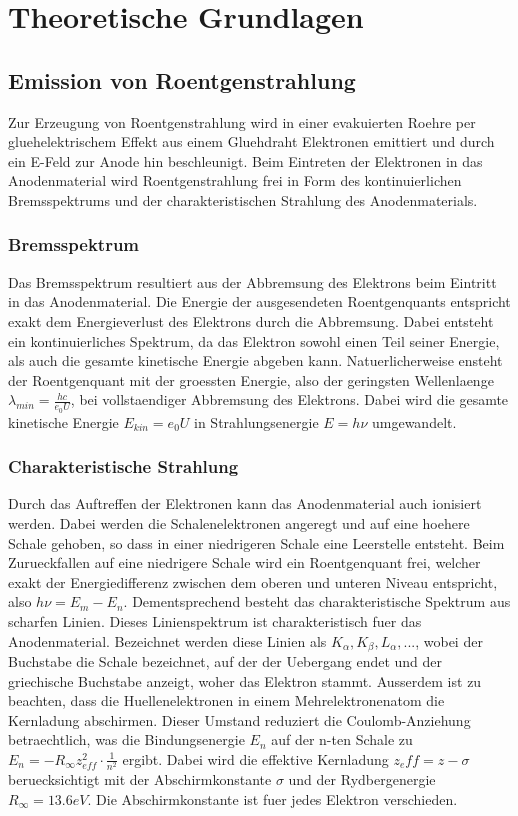\section{Theoretische Grundlagen}
\subsection{Emission von Roentgenstrahlung}
Zur Erzeugung von Roentgenstrahlung wird in einer evakuierten Roehre per gluehelektrischem Effekt aus einem Gluehdraht Elektronen emittiert und durch ein E-Feld zur Anode hin beschleunigt. Beim Eintreten der Elektronen in das Anodenmaterial wird Roentgenstrahlung frei in Form des kontinuierlichen Bremsspektrums und der charakteristischen Strahlung des Anodenmaterials.
\subsubsection{Bremsspektrum}
Das Bremsspektrum resultiert aus der Abbremsung des Elektrons beim Eintritt in das Anodenmaterial. Die Energie der ausgesendeten Roentgenquants entspricht exakt dem Energieverlust des Elektrons durch die Abbremsung. Dabei entsteht ein kontinuierliches Spektrum, da das Elektron sowohl einen Teil seiner Energie, als auch die gesamte kinetische Energie abgeben kann. Natuerlicherweise ensteht der Roentgenquant mit der groessten Energie, also der geringsten Wellenlaenge $\lambda_{min}=\frac{hc}{e_0U}$, bei vollstaendiger Abbremsung des Elektrons. Dabei wird die gesamte kinetische Energie $E_{kin}=e_0U$ in Strahlungsenergie $E=h\nu$ umgewandelt.
\subsubsection{Charakteristische Strahlung}
Durch das Auftreffen der Elektronen kann das Anodenmaterial auch ionisiert werden. Dabei werden die Schalenelektronen angeregt und auf eine hoehere Schale gehoben, so dass in einer niedrigeren Schale eine Leerstelle entsteht. Beim Zurueckfallen auf eine niedrigere Schale wird ein Roentgenquant frei, welcher exakt der Energiedifferenz zwischen dem oberen und unteren Niveau entspricht, also $h\nu=E_m-E_n$. Dementsprechend besteht das charakteristische Spektrum aus scharfen Linien. Dieses Linienspektrum ist charakteristisch fuer das Anodenmaterial. Bezeichnet werden diese Linien als $K_\alpha, K_\beta, L_\alpha,...$, wobei der Buchstabe die Schale bezeichnet, auf der der Uebergang endet und der griechische Buchstabe anzeigt, woher das Elektron stammt. Ausserdem ist zu beachten, dass die Huellenelektronen in einem Mehrelektronenatom die Kernladung abschirmen. Dieser Umstand reduziert die Coulomb-Anziehung betraechtlich, was die Bindungsenergie $E_n$ auf der n-ten Schale zu $E_n=-R_{\infty}z^2_{eff}\cdot\frac{1}{n^2}$ ergibt. Dabei wird die effektive Kernladung $z_eff=z-\sigma$ beruecksichtigt mit der Abschirmkonstante $\sigma$ und der Rydbergenergie $R_{\infty}=13.6eV$. Die Abschirmkonstante ist fuer jedes Elektron verschieden.

